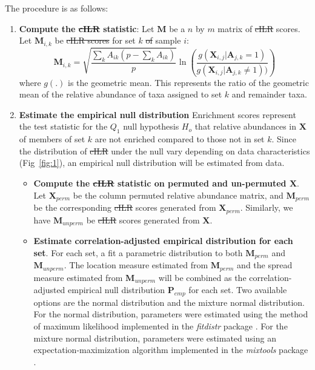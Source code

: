 \documentclass[10pt,letterpaper]{article}
\providecommand{\DIFaddtex}[1]{{\protect\color{blue}\uwave{#1}}} %
\providecommand{\DIFdeltex}[1]{{\protect\color{red}\sout{#1}}}                      %
\providecommand{\DIFaddbegin}{} %
\providecommand{\DIFaddend}{} %
\providecommand{\DIFdelbegin}{} %
\providecommand{\DIFdelend}{} %
\providecommand{\DIFadd}[1]{\texorpdfstring{\DIFaddtex{#1}}{#1}} %
\providecommand{\DIFdel}[1]{\texorpdfstring{\DIFdeltex{#1}}{}} %
\newcommand{\DIFscaledelfig}{0.5}
\newlength{\DIFdelgraphicswidth} %
\newlength{\DIFdelgraphicsheight} %
\newcommand{\DIFaddincludegraphics}[2][]{{\color{blue}\fbox{\DIFOincludegraphics[#1]{#2}}}} %
\newcommand{\DIFdelincludegraphics}[2][]{%
\sbox{\DIFdelgraphicsbox}{\DIFOincludegraphics[#1]{#2}}%
\settoboxwidth{\DIFdelgraphicswidth}{\DIFdelgraphicsbox} %
\settoboxtotalheight{\DIFdelgraphicsheight}{\DIFdelgraphicsbox} %
\scalebox{\DIFscaledelfig}{%
\parbox[b]{\DIFdelgraphicswidth}{\usebox{\DIFdelgraphicsbox}\\[-\baselineskip] \rule{\DIFdelgraphicswidth}{0em}}\llap{\resizebox{\DIFdelgraphicswidth}{\DIFdelgraphicsheight}{%
\setlength{\unitlength}{\DIFdelgraphicswidth}%
\begin{picture}(1,1)%
\thicklines\linethickness{2pt} %
{\color[rgb]{1,0,0}\put(0,0){\framebox(1,1){}}}%
{\color[rgb]{1,0,0}\put(0,0){\line( 1,1){1}}}%
{\color[rgb]{1,0,0}\put(0,1){\line(1,-1){1}}}%
\end{picture}%
}\hspace*{3pt}}} %
} %
\DeclareRobustCommand{\DIFaddbegin}{\DIFOaddbegin \let\includegraphics\DIFaddincludegraphics} %
\DeclareRobustCommand{\DIFaddend}{\DIFOaddend \let\includegraphics\DIFOincludegraphics} %
\DeclareRobustCommand{\DIFdelbegin}{\DIFOdelbegin \let\includegraphics\DIFdelincludegraphics} %
\DeclareRobustCommand{\DIFdelend}{\DIFOaddend \let\includegraphics\DIFOincludegraphics} %
\begin{document}
The procedure is as follows:  
\begin{enumerate}
    \item \textbf{Compute the \DIFdelbegin \DIFdel{cILR }\DIFdelend \DIFaddbegin \DIFadd{CBEA }\DIFaddend statistic}: Let $\mathbf{M}$ be a $n$ by $m$ matrix of \DIFdelbegin \DIFdel{cILR }\DIFdelend \DIFaddbegin \DIFadd{CBEA }\DIFaddend scores. Let $\mathbf{M}_{i,k}$ be \DIFdelbegin \DIFdel{cILR scores }\DIFdelend \DIFaddbegin \DIFadd{CBEA score }\DIFaddend for set $k$ \DIFdelbegin \DIFdel{of }\DIFdelend \DIFaddbegin \DIFadd{and }\DIFaddend sample $i$:   
    \begin{equation}\label{main_eq}
        \mathbf{M}_{i,k} = \sqrt{\frac{\sum_k A_{ik}(p - \sum_k A_{ik})}{p}} \ln \left( \frac{g(\mathbf{X}_{i,j}|\mathbf{A}_{j,k} = 1)}{g(\mathbf{X}_{i,j}|\mathbf{A}_{j,k} \neq 1))} \right)
    \end{equation}
    where $g(.)$ is the geometric mean. This represents the ratio of the geometric mean of the relative abundance of taxa assigned to set $k$ and remainder taxa. 
    \item \textbf{Estimate the empirical null distribution} Enrichment scores represent the test statistic for the $Q_1$ null hypothesis $H_o$ that relative abundances in $\mathbf{X}$ of members of set $k$ are not enriched compared to those not in set $k$. Since the distribution of \DIFdelbegin \DIFdel{cILR }\DIFdelend \DIFaddbegin \DIFadd{CBEA }\DIFaddend under the null vary depending on data characteristics (Fig~\ref{fig:1}), an empirical null distribution will be estimated from data.
    \begin{itemize}
        \item \textbf{Compute the \DIFdelbegin \DIFdel{cILR }\DIFdelend \DIFaddbegin \DIFadd{CBEA }\DIFaddend statistic on permuted and un-permuted $\mathbf{X}$}.  Let $\mathbf{X}_{perm}$ be the column permuted relative abundance matrix, and $\mathbf{M}_{perm}$ be the corresponding \DIFdelbegin \DIFdel{cILR }\DIFdelend \DIFaddbegin \DIFadd{CBEA }\DIFaddend scores generated from $\mathbf{X}_{perm}$. Similarly, we have $\mathbf{M}_{unperm}$ be \DIFdelbegin \DIFdel{cILR }\DIFdelend \DIFaddbegin \DIFadd{CBEA }\DIFaddend scores generated from $\mathbf{X}$.
        \item \textbf{Estimate correlation-adjusted empirical distribution for each set}. For each set, a fit a parametric distribution to both $\mathbf{M}_{perm}$ and $\mathbf{M}_{unperm}$. The location measure estimated from $\mathbf{M}_{perm}$ and the spread measure estimated from $\mathbf{M}_{unperm}$ will be combined as the correlation-adjusted empirical null distribution $\mathbf{P}_{emp}$ for each set. Two available options are the normal distribution and the mixture normal distribution. For the normal distribution, parameters were estimated using the method of maximum likelihood implemented in the \emph{fitdistr} package \cite{delignette-muller2015}. For the mixture normal distribution, parameters were estimated using an expectation-maximization algorithm implemented in the \emph{mixtools} package \cite{benaglia2009}. 

\end{itemize}
\end{enumerate}
\end{document}
